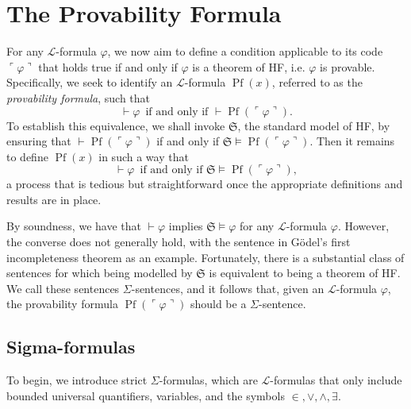 \chapter{The Provability Formula}

For any $\mathcal{L}$-formula $\varphi$, we now aim to define a condition applicable to
its code $\ulcorner\varphi\urcorner$ that holds true if and only if $\varphi$ is a theorem of HF, 
i.e. $\varphi$ is provable. 
Specifically, we seek to identify an $\mathcal{L}$-formula $\operatorname{Pf}(x)$,
referred to as the \textit{provability formula}, such that
$$
\vdash \varphi \,\text{ if and only if } \vdash \operatorname{Pf}(\ulcorner{\varphi}\urcorner).
$$
To establish this equivalence, we shall invoke $\mathfrak{S}$, the standard model of HF,
by ensuring that $\vdash \operatorname{Pf}(\ulcorner{\varphi}\urcorner)$ if and only if
$\mathfrak{S} \vDash \operatorname{Pf}(\ulcorner{\varphi}\urcorner)$. 
Then it remains to define $\operatorname{Pf}(x)$ in such a way that
$$
\vdash \varphi \,\text{ if and only if } 
\mathfrak{S} \vDash \operatorname{Pf}(\ulcorner{\varphi}\urcorner),
$$
a process that is tedious but straightforward once the appropriate definitions and results 
are in place.

By soundness, we have that $\vdash \varphi$ implies 
$\mathfrak{S} \vDash \varphi$ for any $\mathcal{L}$-formula $\varphi$.
However, the converse does not generally hold, with the sentence in Gödel's first incompleteness
theorem as an example.
Fortunately, there is a substantial class of sentences for which being modelled by $\mathfrak{S}$
is equivalent to being a theorem of HF.
We call these sentences $\Sigma$-sentences, and it follows that, given an $\mathcal{L}$-formula 
$\varphi$, the provability formula $\operatorname{Pf}(\ulcorner{\varphi}\urcorner)$ should be
a $\Sigma$-sentence.

\section{Sigma-formulas}

To begin, we introduce strict $\Sigma$-formulas, 
which are $\mathcal{L}$-formulas that only include bounded universal quantifiers, variables, 
and the symbols $\in, \lor, \land, \exists$.

